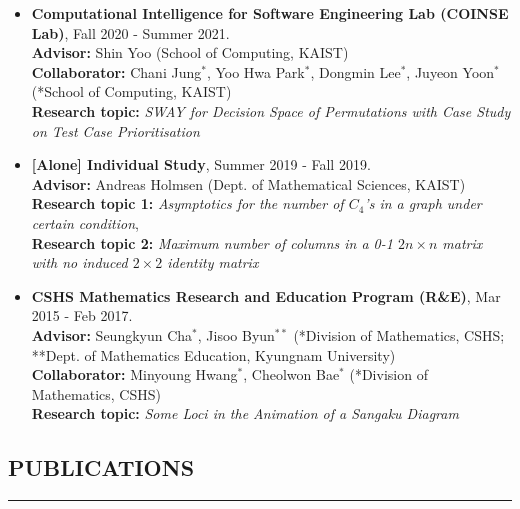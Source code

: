 \documentclass[10pt,a4]{article}
\begin{document}
\begin{small}
\begin{itemize}
 \item {\bf Computational Intelligence for Software Engineering Lab (COINSE Lab)}, Fall 2020 - Summer 2021. \\
{\bf Advisor:} Shin Yoo (School of Computing, KAIST) \\
 {\bf Collaborator:} Chani Jung$^{*}$, Yoo Hwa Park$^{*}$, Dongmin Lee$^{*}$, Juyeon Yoon$^{*}$ (*School of Computing, KAIST) \\
{\bf Research topic:} {\it SWAY for Decision Space of Permutations with Case Study on Test Case Prioritisation } \\

 \item {\bf [Alone] Individual Study}, Summer 2019 - Fall 2019. \\
 {\bf Advisor:} Andreas Holmsen (Dept. of Mathematical Sciences, KAIST) \\
 {\bf Research topic 1:} {\it Asymptotics for the number of $C_4$'s in a graph under certain condition}, \\
 {\bf Research topic 2:} {\it Maximum number of columns in a 0-1 $2n \times n$ matrix with no induced $2 \times 2$ identity matrix} \\

\item {\bf CSHS Mathematics Research and Education Program (R\&E)}, Mar 2015 - Feb 2017. \\
 {\bf Advisor:} Seungkyun Cha$^{*}$, Jisoo Byun$^{**}$ (*Division of Mathematics, CSHS; **Dept. of Mathematics Education, Kyungnam University) \\
 {\bf Collaborator:} Minyoung Hwang$^{*}$, Cheolwon Bae$^{*}$ (*Division of Mathematics, CSHS) \\
 {\bf Research topic:} {\it Some Loci in the Animation of a Sangaku Diagram} \\
 
\end{itemize}

\subsection*{PUBLICATIONS}
\hrule
\vspace{0.2cm}


\end{small}
\end{document}
